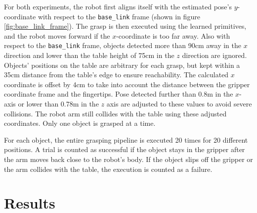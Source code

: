 For both experiments, the robot first aligns itself with the estimated pose's $ y $-coordinate with respect to the
\texttt{base\_link} frame (shown in figure \ref{fig:base_link_frame}). The grasp is then executed using the learned
primitives, and the robot moves forward if the $ x $-coordinate is too far away. Also with respect to the
\texttt{base\_link} frame, objects detected more than 90cm away in the $ x $ direction and lower than the table height
of 75cm in the $ z $ direction are ignored. Objects' positions on the table are arbitrary for each grasp, but kept
within a 35cm distance from the table's edge to ensure reachability. The calculated $ x $ coordinate is offset by 4cm
to take into account the distance between the gripper coordinate frame and the fingertips. Pose detected further than
0.8m in the $ x $-axis or lower than 0.78m in the $ z $ axis are adjusted to these values to avoid severe collisions.
The robot arm still collides with the table using these adjusted coordinates. Only one object is grasped at a time.

For each object, the entire grasping pipeline is executed 20 times for 20 different positions. A trial is counted as
successful if the object stays in the gripper after the arm moves back close to the robot's body. If the object slips
off the gripper or the arm collides with the table, the execution is counted as a failure.


\section{Results}

